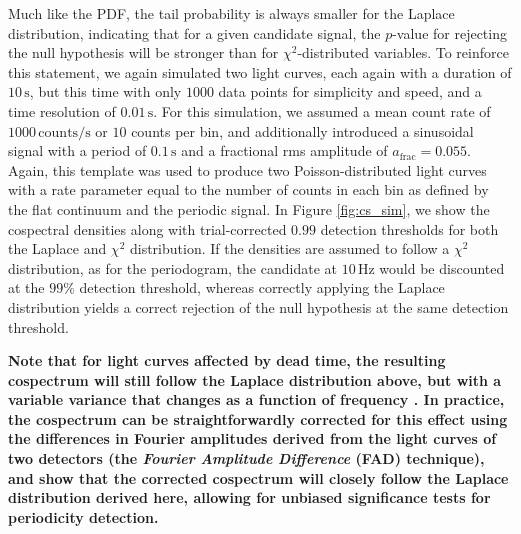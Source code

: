 \documentclass[12pt]{emulateapj}
\begin{document}
\noindent Much like the PDF, the tail probability is always smaller for the Laplace distribution, indicating that for a given candidate signal, the $p$-value for rejecting the null hypothesis will be stronger than for $\chi^2$-distributed variables. To reinforce this statement, we again simulated two light curves, each again with a duration of $10\,\mathrm{s}$, but this time with only $1000$ data points for simplicity and speed, and a time resolution of $0.01\,\mathrm{s}$. For this simulation, we assumed a mean count rate of $1000\,\mathrm{counts/s}$ or $10$ counts per bin, and additionally introduced a sinusoidal signal with a period of $0.1\,\mathrm{s}$ and a fractional rms amplitude of $a_\mathrm{frac} = 0.055$. Again, this template was used to produce two Poisson-distributed light curves with a rate parameter equal to the number of counts in each bin as defined by the flat continuum and the periodic signal. In Figure \ref{fig:cs_sim}, we show the cospectral densities along with trial-corrected $0.99$ detection thresholds for both the Laplace and $\chi^2$ distribution. If the densities are assumed to follow a $\chi^2$ distribution, as for the periodogram, the candidate at $10 \,\mathrm{Hz}$ would be discounted at the $99\%$ detection threshold, whereas correctly applying the Laplace distribution yields a correct rejection of the null hypothesis at the same detection threshold.

\textbf{Note that for light curves affected by dead time, the resulting cospectrum will still follow the Laplace distribution above, but with a variable variance that changes as a function of frequency \citep{Bachetti+15}. In practice, the cospectrum can be straightforwardly corrected for this effect using the differences in Fourier amplitudes derived from the light curves of two detectors (the \textit{Fourier Amplitude Difference} (FAD) technique), and \citet{bachetti2017} show that the corrected cospectrum will closely follow the Laplace distribution derived here, allowing for unbiased significance tests for periodicity detection.}
\end{document}

